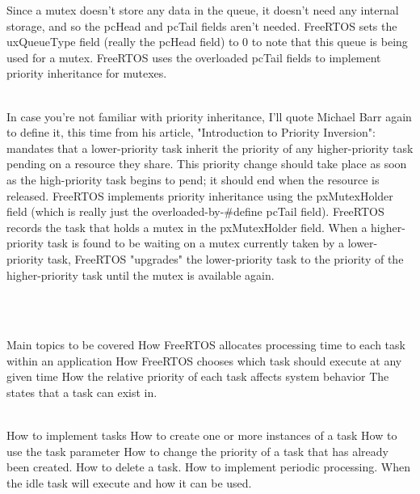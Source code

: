 \begin{description}
\ite Since a mutex doesn't store any data in the queue, it doesn't need any internal storage, and so the pcHead and pcTail fields aren't needed. FreeRTOS sets the uxQueueType field (really the pcHead field) to 0 to note that this queue is being used for a mutex. FreeRTOS uses the overloaded pcTail fields to implement priority inheritance for mutexes.
\ei

\os{\newpage}



\item[{\rot\bf Priority Inheritance}]~\\[-3ex]
\bi
\ite In case you're not familiar with priority inheritance, I'll quote Michael Barr again to define it, this time from his article, "Introduction to Priority Inversion":
\ite
{} mandates that a lower-priority task inherit the priority of any higher-priority task pending on a resource they share. This priority change should take place as soon as the high-priority task begins to pend; it should end when the resource is released.
\ite FreeRTOS implements priority inheritance using the pxMutexHolder field (which is really just the overloaded-by-#define pcTail field). FreeRTOS records the task that holds a mutex in the pxMutexHolder field. When a higher-priority task is found to be waiting on a mutex currently taken by a lower-priority task, FreeRTOS "upgrades" the lower-priority task to the priority of the higher-priority task until the mutex is available again.
\ei

\os{\newpage}



\item[{\rot\bf Task management}]~\\[-3ex]

\os{\newpage}



\item[{\rot\bf Introduction and scope}]~\\[-3ex]
\bi
\ite Main topics to be covered
\bi
\ite How FreeRTOS allocates processing time to each task within an application
\ite How FreeRTOS chooses which task should execute at any given time
\ite How the relative priority of each task affects system behavior
\ite The states that a task can exist in.
\ei
\ei

\os{\newpage}



\item[{\rot\bf More specific topics }]~\\[-3ex]
\bi
\ite How to implement tasks
\ite How to create one or more instances of a task
\ite How to use the task parameter
\ite How to change the priority of a task that has already been created.
\ite How to delete a task.
\ite How to implement periodic processing.
\ite When the idle task will execute and how it can be used.
\ei


\end{description}
